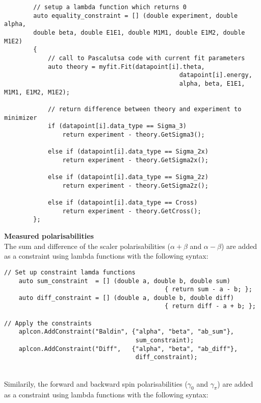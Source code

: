 \documentclass[]{article}
\begin{document}
\begin{lstlisting}
        // setup a lambda function which returns 0
        auto equality_constraint = [] (double experiment, double alpha, 
        double beta, double E1E1, double M1M1, double E1M2, double M1E2) 
        {
	        // call to Pascalutsa code with current fit parameters
	        auto theory = myfit.Fit(datapoint[i].theta, 
										        datapoint[i].energy,
										        alpha, beta, E1E1, M1M1, E1M2, M1E2);       
        
	        // return difference between theory and experiment to minimizer
	        if (datapoint[i].data_type == Sigma_3)
				return experiment - theory.GetSigma3();
				
	        else if (datapoint[i].data_type == Sigma_2x)
				return experiment - theory.GetSigma2x();
				
	        else if (datapoint[i].data_type == Sigma_2z)
				return experiment - theory.GetSigma2z();
				
	        else if (datapoint[i].data_type == Cross)
				return experiment - theory.GetCross();
        };
\end{lstlisting}

\noindent \textbf{Measured polarisabilities} \\

The sum and difference of the scaler polarisabilities ($\alpha+\beta$ and $\alpha-\beta$) are added as a constraint using lambda functions with the following syntax: \\

\begin{lstlisting}
// Set up constraint lamda functions
    auto sum_constraint  = [] (double a, double b, double sum)
										    { return sum - a - b; };
    auto diff_constraint = [] (double a, double b, double diff)
										    { return diff - a + b; };
    
// Apply the constraints
    aplcon.AddConstraint("Baldin", {"alpha", "beta", "ab_sum"},  
									sum_constraint);
    aplcon.AddConstraint("Diff",   {"alpha", "beta", "ab_diff"}, 
								    diff_constraint);
\end{lstlisting}

\noindent \\Similarily, the forward and backward spin polarisabilities ($\gamma_0$ and $\gamma_{\pi}$) are added as a constraint using lambda functions with the following syntax: \\
\end{document}
